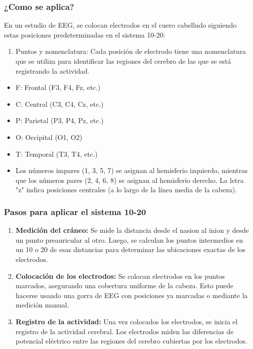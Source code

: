 \documentclass{article}
\begin{document}
\subsubsection{¿Como se aplica?}

En un estudio de EEG, se colocan electrodos en el cuero cabelludo siguiendo estas posiciones predeterminadas en el sistema 10-20:

\begin{enumerate}
    \item Puntos y nomenclatura: Cada posición de electrodo tiene una nomenclatura que se utiliza para identificar las regiones del cerebro de las que se está registrando la actividad.
\end{enumerate}

\begin{itemize}
    \item F: Frontal (F3, F4, Fz, etc.)
    \item C: Central (C3, C4, Cz, etc.)
    \item P: Parietal (P3, P4, Pz, etc.)
    \item O: Occipital (O1, O2)
    \item T: Temporal (T3, T4, etc.)
    \item Los números impares (1, 3, 5, 7) se asignan al hemisferio izquierdo, mientras que los números pares (2, 4, 6, 8) se asignan al hemisferio derecho. La letra "z" indica posiciones centrales (a lo largo de la línea media de la cabeza).
\end{itemize}

\subsubsection{Pasos para aplicar el sistema 10-20}

\begin{enumerate}

    \item \textbf{Medición del cráneo:} Se mide la distancia desde el nasion al inion y desde un punto preauricular al otro. Luego, se calculan los puntos intermedios en un 10 o 20 de esas distancias para determinar las ubicaciones exactas de los electrodos.
    
    \item \textbf{Colocación de los electrodos:} Se colocan electrodos en los puntos marcados, asegurando una cobertura uniforme de la cabeza. Esto puede hacerse usando una gorra de EEG con posiciones ya marcadas o mediante la medición manual.
    
    \item \textbf{Registro de la actividad:} Una vez colocados los electrodos, se inicia el registro de la actividad cerebral. Los electrodos miden las diferencias de potencial eléctrico entre las regiones del cerebro cubiertas por los electrodos.
\end{enumerate}
\end{document}

